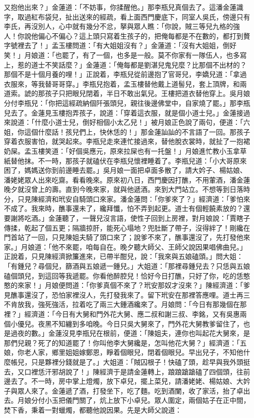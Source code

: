 又抱他出來？」金蓮道：「不妨事，你揉醒他。」那李瓶兒真個去了。這潘金蓮識字，取過紅布袋兒，扯出送來的經疏，看上面西門慶底下，同室人吳氏，傍邊只有李氏，再沒別人，心中就有幾分不忿，拏與眾人瞧：「你說，賊三等兒九格的強人！你說他偏心不偏心？這上頭只寫着生孩子的，把俺每都是不在數的，都打到贅字號裡去了！」孟玉樓問道：「有大姐姐沒有？」金蓮道：「沒有大姐姐，倒好笑！」月娘道：「也罷了，有了一個，也多是一般。莫不你家有一隊伍人，也多寫上，惹的道士不笑話麼？」金蓮道：「俺每都是劉湛兒鬼兒麼？比那個不出材的？那個不是十個月養的哩！」正說着，李瓶兒從前邊抱了官哥兒，李嬌兒道：「拿過衣服來，等我替哥哥穿。」李瓶兒抱着，孟玉樓替他戴上道髻兒，套上頂牌，和兩道索。諕的那孩子只把眼兒閉着，半日不敢出氣兒。王樓把道衣替他穿上。吳月娘分付李瓶兒：「你把這經疏納個阡張頭兒，親往後邊佛堂中，自家燒了罷。」那李瓶兒去了。金蓮見玉樓抱弄孩子，說道：「穿着這衣服，就是個小道士兒。」金蓮接過來說道：「什麼小道士兒，倒好相個小太乙兒！」被月娘正色說了兩句，便道：「六姐，你這個什麼話！孩兒們上，快休恁的！」那金蓮訕訕的不言語了一回。那孩子穿着衣服害怕，就哭起來。李瓶兒走來連忙接過來，替他脫衣裳時，就扯了一抱裙奶屎。孟玉樓笑道：「好個吳應元，原來拉屎也有一托盤！」月娘進忙教小玉拿草紙替他抹。不一時，那孩子就磕伏在李瓶兒懷裡睡着了。李瓶兒道：「小大哥原來困了，媽媽送你到前邊睡去罷。」吳月娘一面把卓面多散了，請大妗子、楊姑娘、潘姥姥眾人出來吃齋。看看晚來。原來初八日，西門慶因打醮，不用葷酒，潘金蓮晚夕就沒曾上的壽。直到今晚來家，就與他遞酒。來到大門站立。不想等到日落時分，只見陳經濟和玳安自騎頭口來家。潘金蓮問：「你爹來了？」經濟道：「爹怕來不成了。我來時，醮事還未了，纔拜懺，怕不弄到起更。道士有個輕饒素放的？還要謝將吃酒。」金蓮聽了，一聲兒沒言語，使性子回到上房裡，對月娘說：「賈瞎子傳揉，乾起了個五更；隔牆掠肝，能死心塌地？兜肚斷了帶子，沒得絆了！剛纔在門首站了一回，只見陳姐夫騎了頭口來了；說爹不來了，醮事還沒了，先打發他來家。」月娘道：「他不來罷，咱每自在。晚夕聽大師父、王師父說因果唱佛曲兒。」正說着，只見陳經濟掀簾進來，已帶半酣兒，說：「我來與五娘磕頭。」問大姐：「有鍾兒？尋個兒，篩酒與五娘遞一鍾兒。」大姐道：「那裡尋鍾兒去？只恁與五娘磕個頭兒，到這回等我遞罷。你看他醉腔兒！恰好今日打醮，只好了你，吃的恁憨憨的來家！」月娘便問道：「你爹真個不來了？玳安那奴才沒來？」陳經濟道：「爹見醮事還沒了，恐怕家裡沒人，先打發我來了。留下玳安在那裡答應哩。道士再三不肯放我，強死強活，拉着吃了兩三大鍾酒纔來了。月娘問：「今日有那幾個在那裡？」經濟道：「今日有大舅和門外花大舅、應二叔和謝三叔、李銘，又有吳惠兩個小優兒。夜黑不知纏到多咱晚。今日只吳大舅來了，門外花大舅教爹留住了，也是過夜的數。」金蓮沒見李瓶兒在根前，便道：「陳姐夫，連你也叫起花大舅來，是那們兒親？死了的知道罷了！你叫他李大舅纔是，怎叫他花大舅？」經濟道：「五娘，你老人家，鄉里姐姐嫁鄭恩，睜着個眼兒，閉着個眼兒。早出兒子，不知他什麼帳兒，只是夥裡分錢就是了。」大姐道：「賊囚根子！快磕了頭，趁早與我外頭挺去，又口裡恁汗邪胡說了！」陳經濟于是請金蓮轉上，踉踉蹌蹌磕了四個頭，往前邊去了。不一時，房中掌上燈燭，放下卓兒，擺上菜兒，請潘姥姥、楊姑娘、大妗子與眾人來了。金蓮遞了酒，打發坐下，吃了麵。吃到酒闌，收了家活，抬了卓出去。月娘分付小玉把儀門關了，炕上放下小卓兒。眾人圍定，兩個姑子在正中間，焚下香，秉着一對蠟燭，都聽他說因果。先是大師父說道：


